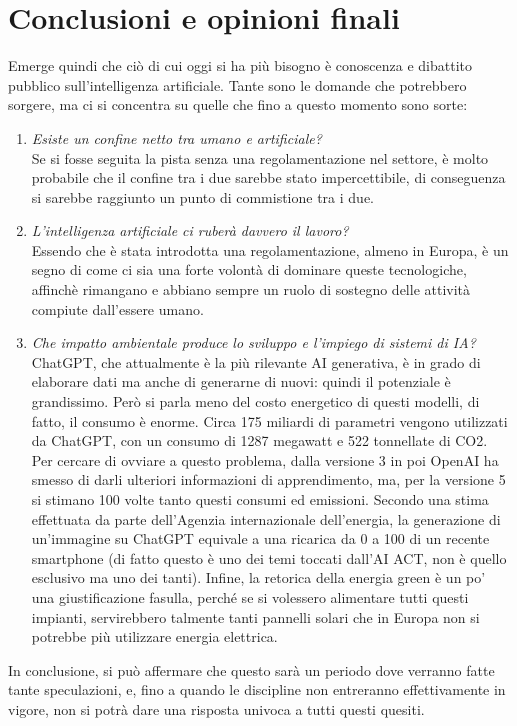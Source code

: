 \documentclass{article}
\begin{document}
\centering
\section{Conclusioni e opinioni finali}
\begin{justify}
   Emerge quindi che ciò di cui oggi si ha più bisogno è conoscenza e dibattito pubblico sull'intelligenza artificiale. Tante sono le domande che potrebbero sorgere, ma ci si concentra su quelle che fino a questo momento sono sorte:
   \begin{enumerate}
       \item \textit{Esiste un confine netto tra umano e artificiale?}\\
       Se si fosse seguita la pista senza una regolamentazione nel settore, è molto probabile che il confine tra i due sarebbe stato impercettibile, di conseguenza si sarebbe raggiunto un punto di commistione tra i due.
       \item \textit{L’intelligenza artificiale ci ruberà davvero il lavoro?}\\
       Essendo che è stata introdotta una regolamentazione, almeno in Europa, è un segno di come ci sia una forte volontà di dominare queste tecnologiche, affinchè rimangano e abbiano sempre un ruolo di sostegno delle attività compiute dall'essere umano.
       \item \textit{Che impatto ambientale produce lo sviluppo e l'impiego di sistemi di IA?}\\
       ChatGPT, che attualmente è la più rilevante AI generativa, è in grado di elaborare dati ma anche di generarne di nuovi: quindi il potenziale è grandissimo. Però si parla meno del costo energetico di questi modelli, di fatto, il consumo è enorme. Circa 175 miliardi di parametri vengono utilizzati da ChatGPT, con un consumo di 1287 megawatt e 522 tonnellate di CO2. Per cercare di ovviare a questo problema, dalla versione 3 in poi OpenAI ha smesso di darli ulteriori informazioni di apprendimento, ma, per la versione 5 si stimano 100 volte tanto questi consumi ed emissioni.
       Secondo una stima effettuata da parte dell'Agenzia internazionale dell'energia, la generazione di un’immagine su ChatGPT equivale a una ricarica da 0 a 100 di un recente smartphone (di fatto questo è uno dei temi toccati dall’AI ACT, non è quello esclusivo ma uno dei tanti).
       Infine, la retorica della energia green è un po’ una giustificazione fasulla, perché se si volessero alimentare tutti questi impianti, servirebbero talmente tanti pannelli solari che in Europa non si potrebbe più utilizzare energia elettrica.\citep{nast_se_2023}
   \end{enumerate}
   In conclusione, si può affermare che questo sarà un periodo dove verranno fatte tante speculazioni, e, fino a quando le discipline non entreranno effettivamente in vigore, non si potrà dare una risposta univoca a tutti questi quesiti.
\end{justify}

\newpage\begin{justify}
    
    
\end{justify}
\end{document}

